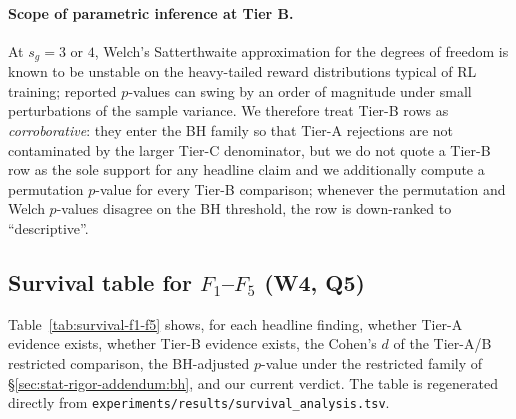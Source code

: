 \paragraph{Scope of parametric inference at Tier B.}
At $s_g = 3$ or $4$, Welch's Satterthwaite approximation for the
degrees of freedom is known to be unstable on the heavy-tailed reward
distributions typical of RL training; reported $p$-values can swing by
an order of magnitude under small perturbations of the sample variance.
We therefore treat Tier-B rows as \emph{corroborative}: they enter the
BH family so that Tier-A rejections are not contaminated by the larger
Tier-C denominator, but we do not quote a Tier-B row as the sole
support for any headline claim and we additionally compute a permutation
$p$-value for every Tier-B comparison; whenever the permutation and
Welch $p$-values disagree on the BH threshold, the row is
down-ranked to ``descriptive''.

\subsection{Survival table for $F_1$--$F_5$ (W4, Q5)}
\label{sec:stat-rigor-addendum:survival}

Table~\ref{tab:survival-f1-f5} shows, for each headline finding,
whether Tier-A evidence exists, whether Tier-B evidence exists,
the Cohen's $d$ of the Tier-A/B restricted comparison, the
BH-adjusted $p$-value under the restricted family of
\S\ref{sec:stat-rigor-addendum:bh}, and our current verdict. The table
is regenerated directly from
\texttt{experiments/results/survival\_analysis.tsv}.

